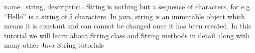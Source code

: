 {
    name=string,
    description={String is nothing but a sequence of characters, for e.g. “Hello” is a string of 5 characters. In java, string is an immutable object which means it is constant and can cannot be changed once it has been created. In this tutorial we will learn about String class and String methods in detail along with many other Java String tutorials }
}
